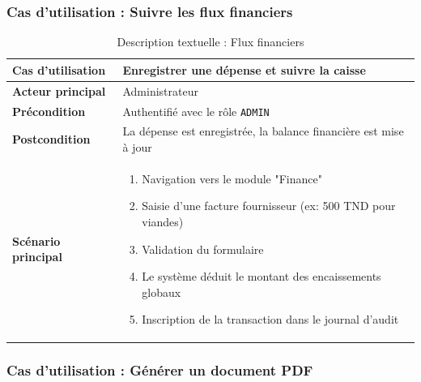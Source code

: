 \subsubsection{Cas d'utilisation : Suivre les flux financiers}

\begin{table}[H]
    \centering
    \caption{Description textuelle : Flux financiers}
    \label{tab:desc_finance}
    \renewcommand{\arraystretch}{1.3}
    \begin{tabular}{|p{4cm}|p{8.5cm}|}
        \hline
        \textbf{Cas d'utilisation} & Enregistrer une dépense et suivre la caisse \\
        \hline
        \textbf{Acteur principal} & Administrateur \\
        \hline
        \textbf{Précondition} & Authentifié avec le rôle \texttt{ADMIN} \\
        \hline
        \textbf{Postcondition} & La dépense est enregistrée, la balance financière est mise à jour \\
        \hline
        \textbf{Scénario principal} &
        \begin{enumerate}
            \item Navigation vers le module "Finance"
            \item Saisie d'une facture fournisseur (ex: 500 TND pour viandes)
            \item Validation du formulaire
            \item Le système déduit le montant des encaissements globaux
            \item Inscription de la transaction dans le journal d'audit
        \end{enumerate} \\
        \hline
    \end{tabular}
\end{table}

\subsubsection{Cas d'utilisation : Générer un document PDF}

